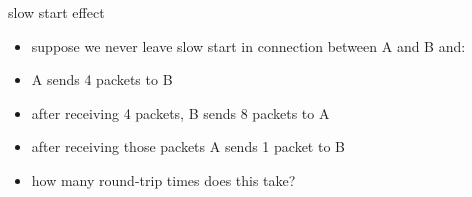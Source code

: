 \begin{frame}{slow start effect}
    \begin{itemize}
    \item suppose we never leave slow start in connection between A and B and:
    \vspace{.5cm}
    \item A sends 4 packets to B
    \item after receiving 4 packets, B sends 8 packets to A
    \item after receiving those packets A sends 1 packet to B
    \vspace{.5cm}
    \item how many round-trip times does this take?
    \end{itemize}
\end{frame}
